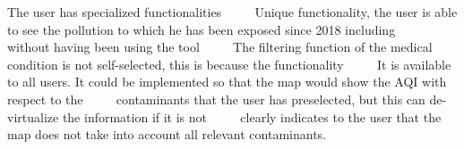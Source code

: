      


\begin{itemize}
  \done The user has specialized functionalities
     \done Unique functionality, the user is able to see the pollution to which he has been exposed since 2018 including
     without having been using the tool
     \crossed The filtering function of the medical condition is not self-selected, this is because the functionality
     It is available to all users. It could be implemented so that the map would show the AQI with respect to the
     contaminants that the user has preselected, but this can de-virtualize the information if it is not
     clearly indicates to the user that the map does not take into account all relevant contaminants.
\end{itemize}
 \newpage